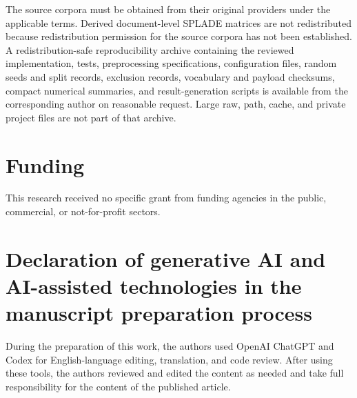 \documentclass[preprint,12pt,authoryear]{elsarticle}
\begin{document}
The source corpora must be obtained from their original providers under the
applicable terms. Derived document-level SPLADE matrices are not redistributed
because redistribution permission for the source corpora has not been
established. A redistribution-safe reproducibility archive containing the
reviewed implementation, tests, preprocessing specifications, configuration
files, random seeds and split records, exclusion records, vocabulary and
payload checksums, compact numerical summaries, and result-generation scripts
is available from the corresponding author on reasonable request. Large raw,
path, cache, and private project files are not part of that archive.

\section*{Funding}

This research received no specific grant from funding agencies in the public,
commercial, or not-for-profit sectors.

\section*{Declaration of generative AI and AI-assisted technologies in the manuscript preparation process}

During the preparation of this work, the authors used OpenAI ChatGPT and Codex
for English-language editing, translation, and code review. After using these
tools, the authors reviewed and edited the content as needed and take full
responsibility for the content of the published article.



\end{document}
